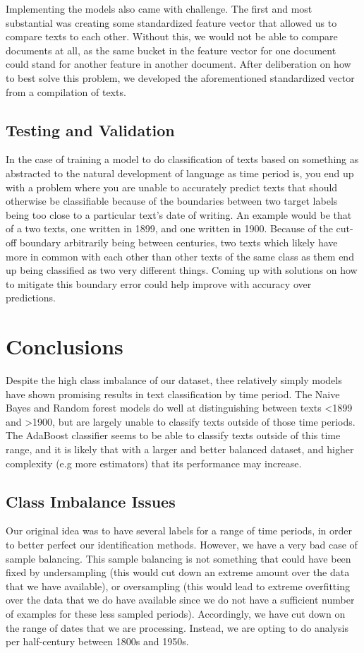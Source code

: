 \documentclass{article}
\begin{document}
Implementing the models also came with challenge. The first and most substantial 
was creating some standardized feature vector that allowed us to compare texts to each other. 
Without this, we would not be able to compare documents at all, as the same 
bucket in the feature vector for one document could stand for another feature in 
another document. After deliberation on how to best solve this problem, we 
developed the aforementioned standardized vector from a compilation of texts. 


\subsection{Testing and Validation}

In the case of training a model to do classification of texts based on something as abstracted 
  to the natural development of language as time period is, you end up with a problem where you are
  unable to accurately predict texts that should otherwise be classifiable because of the boundaries
  between two target labels being too close to a particular text's date of writing. An example would
  be that of a two texts, one written in 1899, and one written in 1900. Because of the cut-off boundary
  arbitrarily being between centuries, two texts which likely have more in common with each other than
  other texts of the same class as them end up being classified as two very different things. Coming up
  with solutions on how to mitigate this boundary error could help improve with accuracy over predictions.


\section{Conclusions}

Despite the high class imbalance of our dataset, thee relatively simply models have shown promising
results in text classification by time period. The Naive Bayes and Random forest models do well at 
distinguishing between texts <1899 and >1900, but are largely unable to classify texts outside of 
those time periods. The AdaBoost classifier seems to be able to classify texts outside of this time
range, and it is likely that with a larger and better balanced dataset, and higher complexity (e.g more estimators)
that its performance may increase. 

\subsection{Class Imbalance Issues}
Our original idea was to have several labels for a range of time periods, in order 
to better perfect our identification methods. However, we have a very bad case of 
sample balancing. This sample balancing is not something that could have been fixed 
by undersampling (this would cut down an extreme amount over the data that we have 
available), or oversampling (this would lead to extreme overfitting over the data 
that we do have available since we do not have a sufficient number of examples for 
these less sampled periods). Accordingly, we have cut down on the range of dates that 
we are processing. Instead, we are opting to do analysis per half-century between 
1800s and 1950s.
\end{document}
